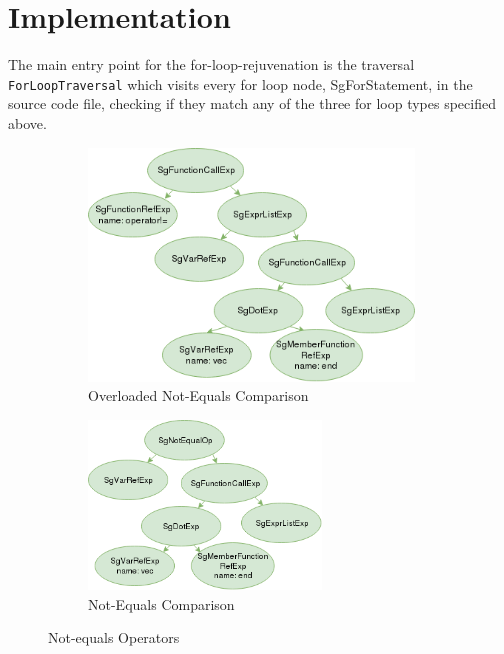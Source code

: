 \documentclass[bsc,frontabs,singlespacing,twoside,parskip,deptreport]{infthesis}
\begin{document}

    

\section{Implementation}

The main entry point for the for-loop-rejuvenation is the traversal \texttt{ForLoopTraversal} which visits every for loop node, SgForStatement, in the source code file, checking if they match any of the three for loop types specified above.

\begin{figure}[H]
    \centering
    
    \begin{subfigure}[b]{0.5\textwidth}
        \centering
        \includegraphics[height=6.2cm]{images/overloaded-cmp.png}
        \caption{Overloaded Not-Equals Comparison}
        \label{for-cmp-neq-overloaded}
    \end{subfigure}
  \hfill
  \begin{subfigure}[b]{0.4\textwidth}
        \centering
        \includegraphics[height=4.5cm]{images/non-overloaded-cmp.png}    
        \caption{Not-Equals Comparison}
        \label{fig:for-cmp-neq}
    \end{subfigure}
    
    \caption{Not-equals Operators}
    \label{fig:comp-operators}
\end{figure}
\end{document}
